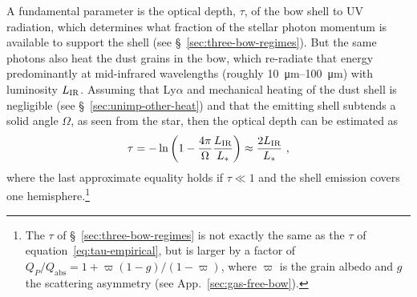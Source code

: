 A fundamental parameter is the optical depth, \(\tau\), of the bow
shell to UV radiation, which determines what fraction of the stellar
photon momentum is available to support the shell (see
\S~\ref{sec:three-bow-regimes}).  But the same photons also heat the
dust grains in the bow, which re-radiate that energy predominantly at
mid-infrared wavelengths (roughly \SIrange{10}{100}{\um}) with
luminosity \(L_{\text{IR}}\).  Assuming that Ly\(\alpha\) and mechanical
heating of the dust shell is negligible (see
\S~\ref{sec:unimp-other-heat}) and that the emitting shell subtends a
solid angle \(\Omega\), as seen from the star, then the optical depth
can be estimated as
\begin{equation}
  \label{eq:tau-empirical}
  \tau = -\ln \left( 1 - \frac{4\pi}{\Omega} \frac{L_{\text{IR}}}{L_*} \right)
  \approx \frac{2 L_{\text{IR}}}{L_*} \ ,
\end{equation}
where the last approximate equality holds if \(\tau \ll 1\) and the
shell emission covers one hemisphere.\footnote{%
  The \(\tau\) of \S~\ref{sec:three-bow-regimes} is not exactly the
  same as the \(\tau\) of equation~\eqref{eq:tau-empirical}, but is
  larger by a factor of
  \(Q_P / Q_{\text{abs}} = 1 + \varpi (1 - g)/(1 - \varpi)\), where
  \(\varpi\) is the grain albedo and \(g\) the scattering asymmetry
  (see App.~\ref{sec:gas-free-bow}).} %

